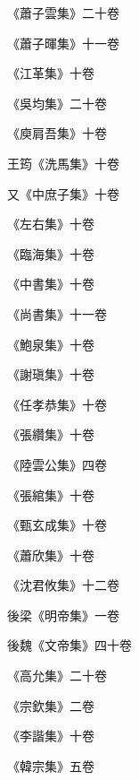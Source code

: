 \begin{pinyinscope}
 《蕭子雲集》二十卷



 《蕭子暉集》十一卷



 《江革集》十卷



 《吳均集》二十卷



 《庾肩吾集》十卷



 王筠《洗馬集》十卷



 又《中庶子集》十卷



 《左右集》十卷



 《臨海集》十卷



 《中書集》十卷



 《尚書集》十一卷



 《鮑泉集》十卷



 《謝瑱集》十卷



 《任孝恭集》十卷



 《張纘集》十卷



 《陸雲公集》四卷



 《張綰集》十卷



 《甄玄成集》十卷



 《蕭欣集》十卷



 《沈君攸集》十二卷



 後梁《明帝集》一卷



 後魏《文帝集》四十卷



 《高允集》二十卷



 《宗欽集》二卷



 《李諧集》十卷



 《韓宗集》五卷




\end{pinyinscope}
